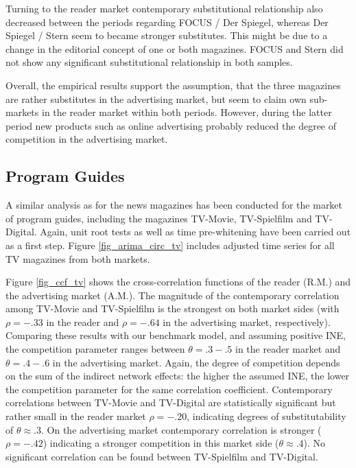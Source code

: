 \documentclass[12pt,a4paper,notitlepage]{article}
\begin{document}
Turning to the reader market contemporary substitutional relationship also decreased between the periods regarding FOCUS / Der Spiegel, whereas Der Spiegel / Stern seem to became stronger substitutes. This might be due to a change in the editorial concept of one or both magazines. FOCUS and Stern did not show any significant substitutional relationship in both samples.  

Overall, the empirical results support the assumption, that the three magazines are rather substitutes in the advertising market, but seem to claim own sub-markets in the reader market within both periods. However, during the latter period new products such as online advertising probably reduced the degree of competition in the advertising market. 






\subsection{Program Guides}

A similar analysis as for the news magazines has been conducted for the market of program guides, including the magazines TV-Movie, TV-Spielfilm and TV-Digital. 
Again, unit root tests as well as time pre-whitening have been carried out as a first step. Figure \ref{fig_arima_circ_tv} includes adjusted time series for all TV magazines from both markets.  


Figure \ref{fig_ccf_tv} shows the cross-correlation functions of the reader (R.M.) and the advertising market (A.M.). The magnitude of the contemporary correlation among TV-Movie and TV-Spielfilm is the strongest on both market sides (with $\rho=-.33$ in the reader and $\rho=-.64$ in the advertising market, respectively). Comparing these results with our benchmark model, and assuming positive INE, the competition parameter ranges between $\theta=.3-.5$ in the reader market and $\theta=.4-.6$ in the advertising market. Again, the degree of competition depends on the sum of the indirect network effects: the higher the assumed INE, the lower the competition parameter for the same correlation coefficient. Contemporary correlations between TV-Movie and TV-Digital are statistically significant but rather small in the reader market $\rho=-.20$, indicating degrees of substitutability of $\theta\approx.3$. On the advertising market contemporary correlation is stronger ($\rho = -.42$) indicating a stronger competition in this market side ($\theta\approx.4$). No significant correlation can be found between TV-Spielfilm and TV-Digital.
\end{document}
